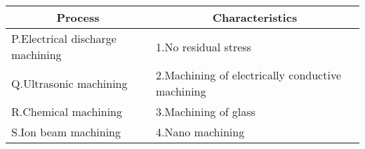 \begin{tabular}{|l|l|}
\hline
\multicolumn{1}{|c|}{\textbf{Process}}    & \multicolumn{1}{|c|}{\textbf{Characteristics}} \\
\hline
P.Electrical discharge machining     & 1.No residual stress\\
\hline
Q.Ultrasonic machining       &2.Machining of electrically conductive machining  \\
\hline
R.Chemical machining      &3.Machining of glass\\
\hline
S.Ion beam machining      &4.Nano machining\\
\hline
\end{tabular}